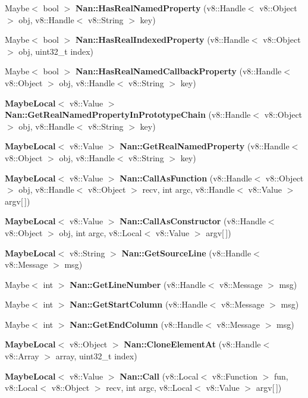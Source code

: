 \begin{DoxyCompactItemize}
\item 
Maybe$<$ bool $>$ \textbf{ Nan\+::\+Has\+Real\+Named\+Property} (v8\+::\+Handle$<$ v8\+::\+Object $>$ obj, v8\+::\+Handle$<$ v8\+::\+String $>$ key)
\item 
Maybe$<$ bool $>$ \textbf{ Nan\+::\+Has\+Real\+Indexed\+Property} (v8\+::\+Handle$<$ v8\+::\+Object $>$ obj, uint32\+\_\+t index)
\item 
Maybe$<$ bool $>$ \textbf{ Nan\+::\+Has\+Real\+Named\+Callback\+Property} (v8\+::\+Handle$<$ v8\+::\+Object $>$ obj, v8\+::\+Handle$<$ v8\+::\+String $>$ key)
\item 
\textbf{ Maybe\+Local}$<$ v8\+::\+Value $>$ \textbf{ Nan\+::\+Get\+Real\+Named\+Property\+In\+Prototype\+Chain} (v8\+::\+Handle$<$ v8\+::\+Object $>$ obj, v8\+::\+Handle$<$ v8\+::\+String $>$ key)
\item 
\textbf{ Maybe\+Local}$<$ v8\+::\+Value $>$ \textbf{ Nan\+::\+Get\+Real\+Named\+Property} (v8\+::\+Handle$<$ v8\+::\+Object $>$ obj, v8\+::\+Handle$<$ v8\+::\+String $>$ key)
\item 
\textbf{ Maybe\+Local}$<$ v8\+::\+Value $>$ \textbf{ Nan\+::\+Call\+As\+Function} (v8\+::\+Handle$<$ v8\+::\+Object $>$ obj, v8\+::\+Handle$<$ v8\+::\+Object $>$ recv, int argc, v8\+::\+Handle$<$ v8\+::\+Value $>$ argv[$\,$])
\item 
\textbf{ Maybe\+Local}$<$ v8\+::\+Value $>$ \textbf{ Nan\+::\+Call\+As\+Constructor} (v8\+::\+Handle$<$ v8\+::\+Object $>$ obj, int argc, v8\+::\+Local$<$ v8\+::\+Value $>$ argv[$\,$])
\item 
\textbf{ Maybe\+Local}$<$ v8\+::\+String $>$ \textbf{ Nan\+::\+Get\+Source\+Line} (v8\+::\+Handle$<$ v8\+::\+Message $>$ msg)
\item 
Maybe$<$ int $>$ \textbf{ Nan\+::\+Get\+Line\+Number} (v8\+::\+Handle$<$ v8\+::\+Message $>$ msg)
\item 
Maybe$<$ int $>$ \textbf{ Nan\+::\+Get\+Start\+Column} (v8\+::\+Handle$<$ v8\+::\+Message $>$ msg)
\item 
Maybe$<$ int $>$ \textbf{ Nan\+::\+Get\+End\+Column} (v8\+::\+Handle$<$ v8\+::\+Message $>$ msg)
\item 
\textbf{ Maybe\+Local}$<$ v8\+::\+Object $>$ \textbf{ Nan\+::\+Clone\+Element\+At} (v8\+::\+Handle$<$ v8\+::\+Array $>$ array, uint32\+\_\+t index)
\item 
\textbf{ Maybe\+Local}$<$ v8\+::\+Value $>$ \textbf{ Nan\+::\+Call} (v8\+::\+Local$<$ v8\+::\+Function $>$ fun, v8\+::\+Local$<$ v8\+::\+Object $>$ recv, int argc, v8\+::\+Local$<$ v8\+::\+Value $>$ argv[$\,$])

\end{DoxyCompactItemize}
